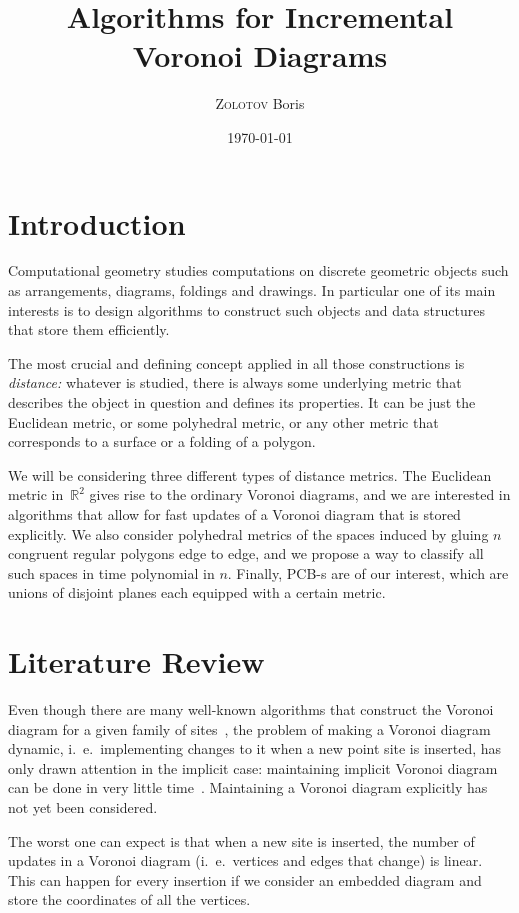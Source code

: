 \documentclass[a4paper,11pt]{article}
\title{Algorithms for Incremental Voronoi Diagrams}
\author{{\scshape Zolotov} Boris}
\date{\today}
\begin{document}
\section{Introduction}

Computational geometry studies computations on discrete geometric objects such as arrangements, diagrams, foldings and drawings. In particular one of its main interests is to design algorithms to construct such objects and data structures that store them efficiently.

The most crucial and defining concept applied in all those constructions is {\itshape distance:} whatever is studied, there is always some underlying metric that describes the object in question and defines its properties. It can be just the Euclidean metric, or some polyhedral metric, or any other metric that corresponds to a surface or a folding of a polygon.

We will be considering three different types of distance metrics. The Euclidean metric in~$\mathbb{R}^2$ gives rise to the ordinary Voronoi diagrams, and we are interested in algorithms that allow for fast updates of a Voronoi diagram that is stored explicitly. We also consider polyhedral metrics of the spaces induced by gluing $n$ congruent regular polygons edge to edge, and we propose a way to classify all such spaces in time polynomial in $n$. Finally, PCB-s are of our interest, which are unions of disjoint planes each equipped with a certain metric.

\section{Literature Review}

Even though there are many well-known algorithms that construct the Voronoi diagram for a given family of sites~\cite{DBLP:books/el/00/AurenhammerK00}, the problem of making a Voronoi diagram dynamic, i.~e.~implementing changes to it when a new point site is inserted, has only drawn attention in the implicit case: maintaining implicit Voronoi diagram can be done in very little time~\cite{DBLP:journals/jacm/Chan10,KaplanMRSS17,Chan19}. Maintaining a Voronoi diagram explicitly has not yet been considered.

The worst one can expect is that when a new site is inserted, the number of updates in a Voronoi diagram (i.~e.~vertices and edges that change) is linear. This can happen for every insertion if we consider an embedded diagram and store the coordinates of all the vertices.
\end{document}
